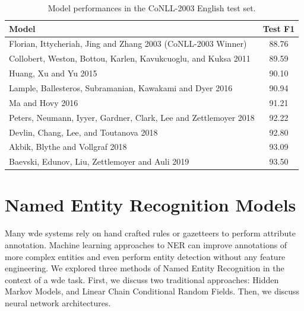 \documentclass{nle}
\begin{document}
\begin{table}[h]
  \small
  \begin{center}
    \begin{tabular}{ lc }
      \toprule
      Model & Test F1 \\
      \midrule
      Florian, Ittycheriah, Jing and Zhang 2003 (CoNLL-2003 Winner)            & 88.76 \\
      Collobert, Weston, Bottou, Karlen, Kavukcuoglu, and Kuksa 2011           & 89.59 \\
      Huang, Xu and Yu 2015                                                    & 90.10 \\
      Lample, Ballesteros, Subramanian, Kawakami and Dyer 2016                 & 90.94 \\
      Ma and Hovy 2016                                                         & 91.21 \\
      Peters, Neumann, Iyyer, Gardner, Clark, Lee and Zettlemoyer 2018         & 92.22 \\
      Devlin, Chang, Lee, and Toutanova 2018                                   & 92.80 \\
      Akbik, Blythe and Vollgraf 2018                                          & 93.09 \\
      Baevski, Edunov, Liu, Zettlemoyer and Auli 2019                          & 93.50 \\
      \bottomrule
    \end{tabular}
  \end{center}
  \caption{Model performances in the {CoNLL-2003} English test set.}
  \label{tab:ner_model_comparison}
\end{table}




\section{Named Entity Recognition Models}

Many \gls{wde} systems rely on hand crafted rules or gazetteers to perform
attribute annotation. Machine learning approaches to NER can improve annotations of 
more complex entities and even perform entity detection without any feature
engineering. We explored three methods of Named Entity Recognition
in the context of a \gls{wde} task. First, we discuss two traditional 
approaches: Hidden Markov Models, and Linear Chain Conditional Random Fields. Then,
we discuss neural network architectures.
\end{document}
